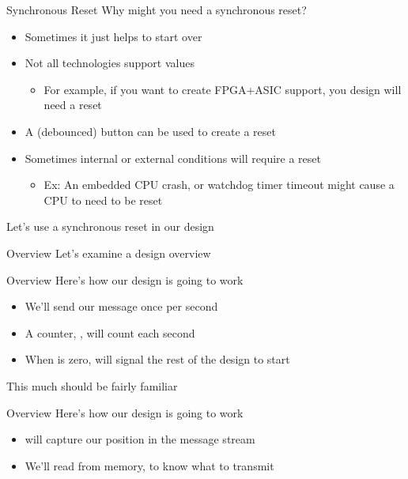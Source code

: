\documentclass[style=gt,mode=present,paper=screen]{powerdot}
\begin{document}
%
%
\begin{slide}[toc=,bm=,method=direct]{Synchronous Reset}
Why might you need a synchronous reset?
\begin{itemize}
\item Sometimes it just helps to start over
\item Not all technologies support  values
\begin{itemize}
	\item For example, if you want to create FPGA+ASIC support,
	you design will need a reset
\end{itemize}
\item A (debounced) button can be used to create a reset
\item Sometimes internal or external conditions will require a reset
\begin{itemize}
	\item Ex: An embedded CPU crash, or watchdog timer timeout
		might cause a CPU to need to be reset
\end{itemize}
\end{itemize}
Let's use a synchronous reset in our design
\end{slide}
%
%
\begin{slide}[method=direct]{Overview}
Let's examine a design overview
\begin{center}
{\def\svgwidth{0.5\slidewidth}}
\end{center}
\end{slide}
%
%
\begin{slide}[toc=,bm=,method=direct]{Overview}
Here's how our design is going to work
\begin{center}
{\def\svgwidth{0.5\slidewidth}}
\end{center}
\begin{itemize}
\item We'll send our message once per second
\item A counter, , will count each second
\item When  is zero, 
	will signal the rest of the design to start
\end{itemize}
This much should be fairly familiar
\end{slide}
%
%
\begin{slide}[toc=,bm=,method=direct]{Overview}
Here's how our design is going to work
\begin{center}
{\def\svgwidth{0.5\slidewidth}}
\end{center}
\begin{itemize}
\item {} will capture our position in the message stream
\item We'll read  from memory, to know what to transmit
\end{itemize}
\end{slide}
\end{document}
